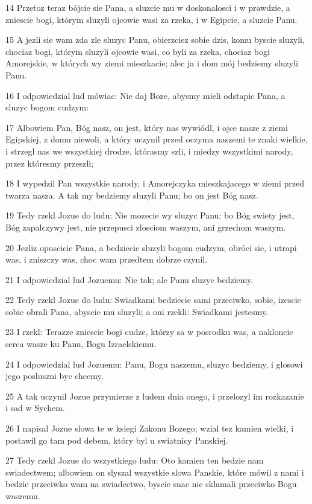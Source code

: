 \par 14 Przetoz teraz bójcie sie Pana, a sluzcie mu w doskonalosci i w prawdzie, a zniescie bogi, którym sluzyli ojcowie wasi za rzeka, i w Egipcie, a sluzcie Panu.
\par 15 A jezli sie wam zda zle sluzyc Panu, obierzciez sobie dzis, komu byscie sluzyli, chociaz bogi, którym sluzyli ojcowie wasi, co byli za rzeka, chociaz bogi Amorejskie, w których wy ziemi mieszkacie; alec ja i dom mój bedziemy sluzyli Panu.
\par 16 I odpowiedzial lud mówiac: Nie daj Boze, abysmy mieli odstapic Pana, a sluzyc bogom cudzym:
\par 17 Albowiem Pan, Bóg nasz, on jest, który nas wywiódl, i ojce nasze z ziemi Egipskiej, z domu niewoli, a który uczynil przed oczyma naszemi te znaki wielkie, i strzegl nas we wszystkiej drodze, którasmy szli, i miedzy wszystkimi narody, przez któresmy przeszli;
\par 18 I wypedzil Pan wszystkie narody, i Amorejczyka mieszkajacego w ziemi przed twarza nasza. A tak my bedziemy sluzyli Panu; bo on jest Bóg nasz.
\par 19 Tedy rzekl Jozue do ludu: Nie mozecie wy sluzyc Panu; bo Bóg swiety jest, Bóg zapalczywy jest, nie przepusci zlosciom waszym, ani grzechom waszym.
\par 20 Jezliz opuscicie Pana, a bedziecie sluzyli bogom cudzym, obróci sie, i utrapi was, i zniszczy was, choc wam przedtem dobrze czynil.
\par 21 I odpowiedzial lud Jozuemu: Nie tak; ale Panu sluzyc bedziemy.
\par 22 Tedy rzekl Jozue do ludu: Swiadkami bedziecie sami przeciwko, sobie, izescie sobie obrali Pana, abyscie mu sluzyli; a oni rzekli: Swiadkami jestesmy.
\par 23 I rzekl: Terazze zniescie bogi cudze, którzy sa w posrodku was, a nakloncie serca wasze ku Panu, Bogu Izraelskiemu.
\par 24 I odpowiedzial lud Jozuemu: Panu, Bogu naszemu, sluzyc bedziemy, i glosowi jego posluszni byc chcemy.
\par 25 A tak uczynil Jozue przymierze z ludem dnia onego, i przelozyl im rozkazanie i sad w Sychem.
\par 26 I napisal Jozue slowa te w ksiegi Zakonu Bozego; wzial tez kamien wielki, i postawil go tam pod debem, który byl u swiatnicy Panskiej.
\par 27 Tedy rzekl Jozue do wszystkiego ludu: Oto kamien ten bedzie nam swiadectwem; albowiem on slyszal wszystkie slowa Panskie, które mówil z nami i bedzie przeciwko wam na swiadectwo, byscie snac nie sklamali przeciwko Bogu waszemu.

